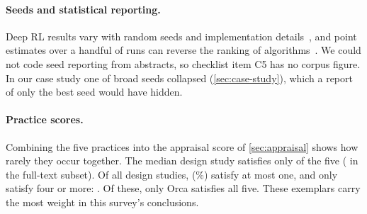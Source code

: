 \paragraph{Seeds and statistical reporting.} Deep RL results vary with random seeds and implementation details~\cite{henderson2018deep}, and point estimates over a handful of runs can reverse the ranking of algorithms~\cite{agarwal2021deep}. We could not code seed reporting from abstracts, so checklist item C5 has no corpus figure. In our case study one of \nCsSeeds{} broad seeds collapsed (\cref{sec:case-study}), which a report of only the best seed would have hidden.

\paragraph{Practice scores.} Combining the five practices into the appraisal score of \cref{sec:appraisal} shows how rarely they occur together. The median design study satisfies only \nScoreMedian{} of the five (\nScoreMedianFT{} in the full-text subset). Of all design studies, \nScoreAtMostOne{} (\nPctScoreAtMostOne\%) satisfy at most one, and only \nScoreFourPlus{} satisfy four or more: \scoreExemplars. Of these, only Orca satisfies all five. These exemplars carry the most weight in this survey's conclusions.

